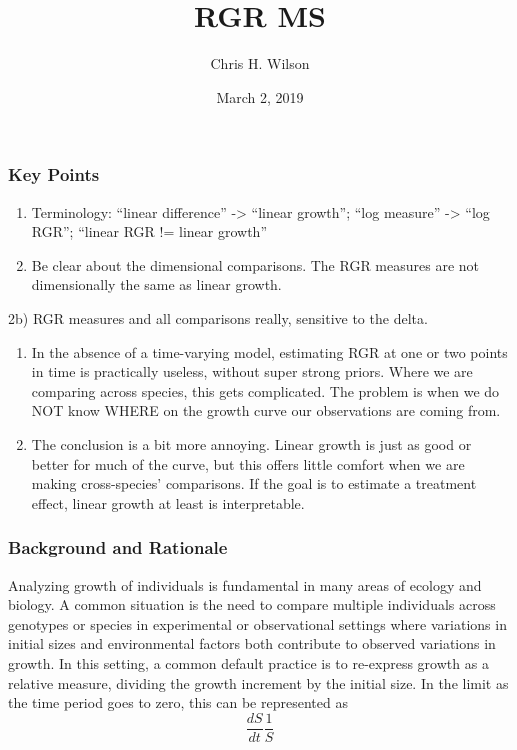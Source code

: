\documentclass[]{article}
\title{RGR MS}
\author{Chris H. Wilson}
\date{March 2, 2019}
\begin{document}
\maketitle

\subsubsection{Key Points}\label{key-points}

\begin{enumerate}
\def\labelenumi{\arabic{enumi})}
\item
  Terminology: ``linear difference'' -\textgreater{} ``linear growth'';
  ``log measure'' -\textgreater{} ``log RGR''; ``linear RGR != linear
  growth''
\item
  Be clear about the dimensional comparisons. The RGR measures are not
  dimensionally the same as linear growth.
\end{enumerate}

2b) RGR measures and all comparisons really, sensitive to the delta.

\begin{enumerate}
\def\labelenumi{\arabic{enumi})}
\setcounter{enumi}{2}
\item
  In the absence of a time-varying model, estimating RGR at one or two
  points in time is practically useless, without super strong priors.
  Where we are comparing across species, this gets complicated. The
  problem is when we do NOT know WHERE on the growth curve our
  observations are coming from.
\item
  The conclusion is a bit more annoying. Linear growth is just as good
  or better for much of the curve, but this offers little comfort when
  we are making cross-species' comparisons. If the goal is to estimate a
  treatment effect, linear growth at least is interpretable.
\end{enumerate}

\subsubsection{Background and Rationale}\label{background-and-rationale}

Analyzing growth of individuals is fundamental in many areas of ecology
and biology. A common situation is the need to compare multiple
individuals across genotypes or species in experimental or observational
settings where variations in initial sizes and environmental factors
both contribute to observed variations in growth. In this setting, a
common default practice is to re-express growth as a relative measure,
dividing the growth increment by the initial size. In the limit as the
time period goes to zero, this can be represented as
\[\frac{dS}{dt}\frac{1}{S}\]
\end{document}
